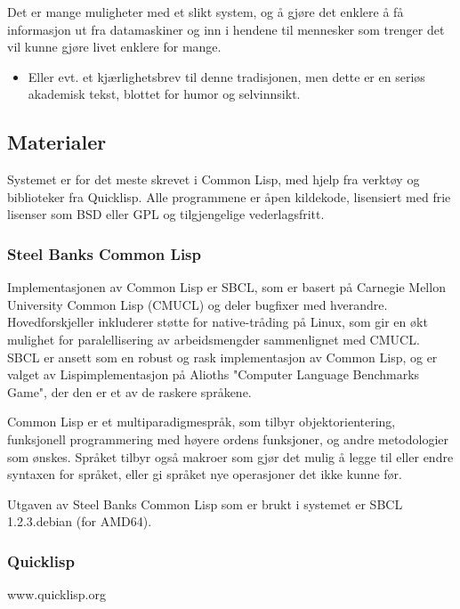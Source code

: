 \documentclass[11pt]{article}
\begin{document}
Det er mange muligheter med et slikt system, og å gjøre det enklere å få informasjon ut fra datamaskiner og inn i hendene til mennesker som trenger det vil kunne gjøre livet enklere for mange.




\begin{itemize}
\item Eller evt. et kjærlighetsbrev til denne tradisjonen, men dette er en seriøs akademisk tekst, blottet for humor og selvinnsikt.
\end{itemize}


\subsection{Materialer}



Systemet er for det meste skrevet i Common Lisp, med hjelp fra verktøy og biblioteker fra Quicklisp.
Alle programmene er åpen kildekode, lisensiert med frie lisenser som BSD eller GPL og tilgjengelige vederlagsfritt.



\subsubsection{Steel Banks Common Lisp}



Implementasjonen av Common Lisp er SBCL, som er basert på Carnegie Mellon University Common Lisp (CMUCL) og deler bugfixer med hverandre.
Hovedforskjeller inkluderer støtte for native-tråding på Linux, som gir en økt mulighet for paralellisering av arbeidsmengder sammenlignet med CMUCL. SBCL er ansett som en robust og rask implementasjon av Common Lisp, og er valget av Lispimplementasjon på Alioths "Computer Language Benchmarks Game", der den er et av de raskere språkene.



Common Lisp er et multiparadigmespråk, som tilbyr objektorientering, funksjonell programmering med høyere ordens funksjoner, og andre metodologier som ønskes. Språket tilbyr også makroer som gjør det mulig å legge til eller endre syntaxen for språket, eller gi språket nye operasjoner det ikke kunne før. 



Utgaven av Steel Banks Common Lisp som er brukt i systemet er SBCL 1.2.3.debian (for AMD64).



\subsubsection{Quicklisp}
www.quicklisp.org
\end{document}

